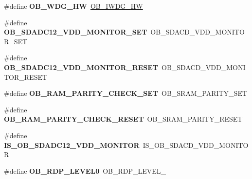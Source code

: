 \begin{DoxyCompactItemize}
\#define {\bfseries O\+B\+\_\+\+W\+D\+G\+\_\+\+HW}~\hyperlink{group___f_l_a_s_h_ex___option___bytes___i_watchdog_gadfcbfa963d79c339ec8e2d5a7734e47a}{O\+B\+\_\+\+I\+W\+D\+G\+\_\+\+HW}
\item 
\mbox{\label{group___h_a_l___f_l_a_s_h___aliased___defines_ga28d03f0c0e87570a3bc2faa4e720b8e3}} 
\#define {\bfseries O\+B\+\_\+\+S\+D\+A\+D\+C12\+\_\+\+V\+D\+D\+\_\+\+M\+O\+N\+I\+T\+O\+R\+\_\+\+S\+ET}~O\+B\+\_\+\+S\+D\+A\+C\+D\+\_\+\+V\+D\+D\+\_\+\+M\+O\+N\+I\+T\+O\+R\+\_\+\+S\+ET
\item 
\mbox{\label{group___h_a_l___f_l_a_s_h___aliased___defines_ga330d35b134c5a576318103b718559b11}} 
\#define {\bfseries O\+B\+\_\+\+S\+D\+A\+D\+C12\+\_\+\+V\+D\+D\+\_\+\+M\+O\+N\+I\+T\+O\+R\+\_\+\+R\+E\+S\+ET}~O\+B\+\_\+\+S\+D\+A\+C\+D\+\_\+\+V\+D\+D\+\_\+\+M\+O\+N\+I\+T\+O\+R\+\_\+\+R\+E\+S\+ET
\item 
\mbox{\label{group___h_a_l___f_l_a_s_h___aliased___defines_ga98952cd374b07146bb79583fd61ef6e6}} 
\#define {\bfseries O\+B\+\_\+\+R\+A\+M\+\_\+\+P\+A\+R\+I\+T\+Y\+\_\+\+C\+H\+E\+C\+K\+\_\+\+S\+ET}~O\+B\+\_\+\+S\+R\+A\+M\+\_\+\+P\+A\+R\+I\+T\+Y\+\_\+\+S\+ET
\item 
\mbox{\label{group___h_a_l___f_l_a_s_h___aliased___defines_gab425a7c5a822ef819107a93463361bd9}} 
\#define {\bfseries O\+B\+\_\+\+R\+A\+M\+\_\+\+P\+A\+R\+I\+T\+Y\+\_\+\+C\+H\+E\+C\+K\+\_\+\+R\+E\+S\+ET}~O\+B\+\_\+\+S\+R\+A\+M\+\_\+\+P\+A\+R\+I\+T\+Y\+\_\+\+R\+E\+S\+ET
\item 
\mbox{\label{group___h_a_l___f_l_a_s_h___aliased___defines_gafc1560626d243a2c9fbd72dbb65c8941}} 
\#define {\bfseries I\+S\+\_\+\+O\+B\+\_\+\+S\+D\+A\+D\+C12\+\_\+\+V\+D\+D\+\_\+\+M\+O\+N\+I\+T\+OR}~I\+S\+\_\+\+O\+B\+\_\+\+S\+D\+A\+C\+D\+\_\+\+V\+D\+D\+\_\+\+M\+O\+N\+I\+T\+OR
\item 
\mbox{\label{group___h_a_l___f_l_a_s_h___aliased___defines_ga7339a05119a474a7bde67e9e500d38cb}} 
\#define {\bfseries O\+B\+\_\+\+R\+D\+P\+\_\+\+L\+E\+V\+E\+L0}~O\+B\+\_\+\+R\+D\+P\+\_\+\+L\+E\+V\+E\+L\+\_

\end{DoxyCompactItemize}
